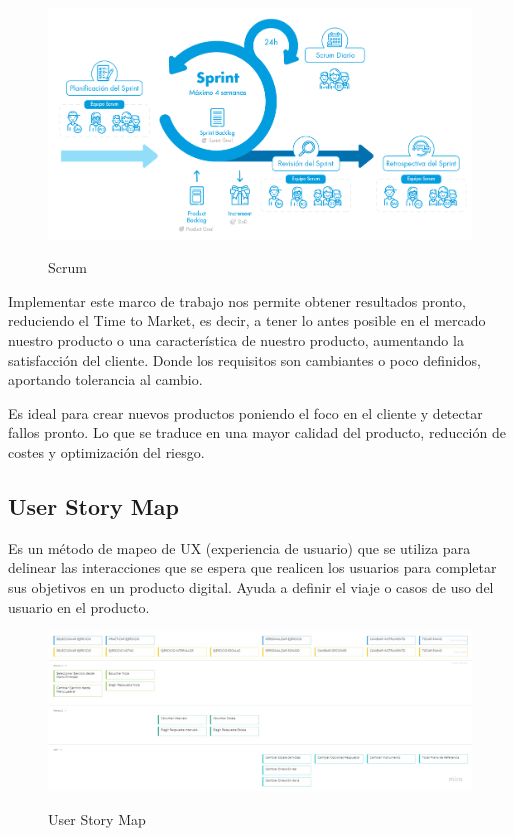 \documentclass[12pt,twoside,titlepage]{report}
\begin{document}
\begin{figure}[H]
    \centering
    \includegraphics[scale=0.39]{Scrum/Scrum}
    \label{fig:Scrum}
    \caption{Scrum}
\end{figure}

Implementar este marco de trabajo nos permite obtener resultados pronto, reduciendo el Time to Market, es decir, a tener lo antes posible en el mercado nuestro producto o una característica de nuestro producto, aumentando la satisfacción del cliente. Donde los requisitos son cambiantes o poco definidos, aportando tolerancia al cambio.

Es ideal para crear nuevos productos poniendo el foco en el cliente y detectar fallos pronto. Lo que se traduce en una mayor calidad del producto, reducción de costes y optimización del riesgo.

\subsection{User Story Map}

Es un método de mapeo de UX (experiencia de usuario) que se utiliza para delinear las interacciones que se espera que realicen los usuarios para completar sus objetivos en un producto digital. Ayuda a definir el viaje o casos de uso del usuario en el producto.

\begin{figure}[H]
    \centering
    \includegraphics[scale=0.25]{Scrum/UserStoryMap}
    \label{fig:UserStoryMap}
    \caption{User Story Map}
\end{figure}
\end{document}
